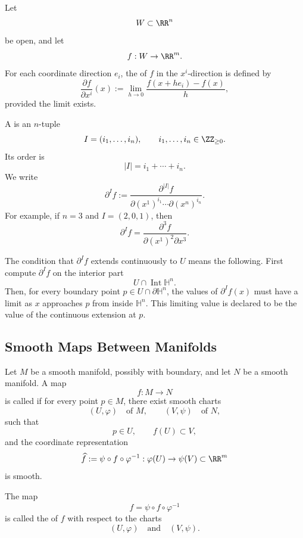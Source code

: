 \begin{definition}
Let
\[
  W\subset \RR^n
\]
be open, and let
\[
  f:W\to \RR^m.
\]
For each coordinate direction $e_i$, the  of $f$ in the $x^i$-direction is defined by
\[
  \frac{\partial f}{\partial x^i}(x)
  :=
  \lim_{h\to 0}
  \frac{f(x+h e_i)-f(x)}{h},
\]
provided the limit exists.

A  is an $n$-tuple
\[
  I=(i_1,\dots,i_n),
  \qquad
  i_1,\dots,i_n\in \ZZ_{\ge 0}.
\]
Its order is
\[
  |I|=i_1+\cdots+i_n.
\]
We write
\[
  \partial^I f
  :=
  \frac{\partial^{|I|} f}
  {\partial (x^1)^{i_1}\cdots \partial (x^n)^{i_n}}.
\]
For example, if $n=3$ and $I=(2,0,1)$, then
\[
  \partial^I f
  =
  \frac{\partial^3 f}{\partial (x^1)^2\partial x^3}.
\]
\end{definition}

\begin{remark}
The condition that $\partial^I f$ extends continuously to $U$ means the following. First compute $\partial^I f$ on the interior part
\[
  U\cap \operatorname{Int}\mathbb H^n.
\]
Then, for every boundary point $p\in U\cap \partial\mathbb H^n$, the values of $\partial^I f(x)$ must have a limit as $x$ approaches $p$ from inside $\mathbb H^n$. This limiting value is declared to be the value of the continuous extension at $p$.
\end{remark}

\subsection{Smooth Maps Between Manifolds}

\begin{definition}
Let $M$ be a smooth manifold, possibly with boundary, and let $N$ be a smooth manifold.
A map
\[
  f:M\to N
\]
is called  if for every point $p\in M$, there exist smooth charts
\[
  (U,\varphi)
  \quad\text{of }M,
  \qquad
  (V,\psi)
  \quad\text{of }N,
\]
such that
\[
  p\in U,
  \qquad
  f(U)\subset V,
\]
and the coordinate representation
\[
  \widehat f
  :=
  \psi\circ f\circ\varphi^{-1}
  :
  \varphi(U)\to \psi(V)\subset \RR^m
\]
is smooth.
\end{definition}

The map
\[
  \widehat f
  =
  \psi\circ f\circ\varphi^{-1}
\]
is called the  of $f$ with respect to the charts
\[
  (U,\varphi)
  \quad\text{and}\quad
  (V,\psi).
\]

